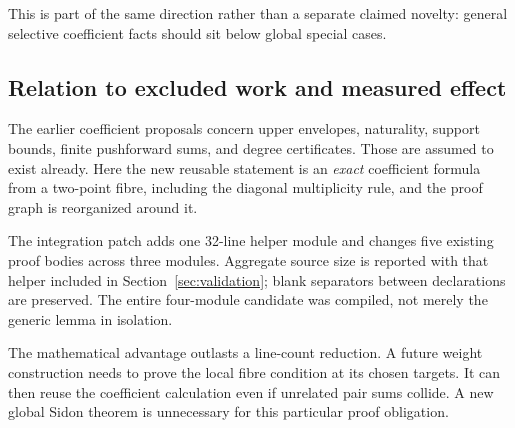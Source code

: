 This is part of the same direction rather than a separate claimed novelty:
general selective coefficient facts should sit below global special cases.

\subsection{Relation to excluded work and measured effect}

The earlier coefficient proposals concern upper envelopes, naturality,
support bounds, finite pushforward sums, and degree certificates. Those are
assumed to exist already. Here the new reusable statement is an \emph{exact}
coefficient formula from a two-point fibre, including the diagonal
multiplicity rule, and the proof graph is reorganized around it.

The integration patch adds one 32-line helper module and changes five
existing proof bodies across three modules. Aggregate source size is
reported with that helper included in Section~\ref{sec:validation}; blank
separators between declarations are preserved. The entire four-module
candidate was compiled, not merely the generic lemma in isolation.

The mathematical advantage outlasts a line-count reduction. A future
weight construction needs to prove the local fibre condition at its chosen
targets. It can then reuse the coefficient calculation even if unrelated
pair sums collide. A new global Sidon theorem is unnecessary for this
particular proof obligation.
